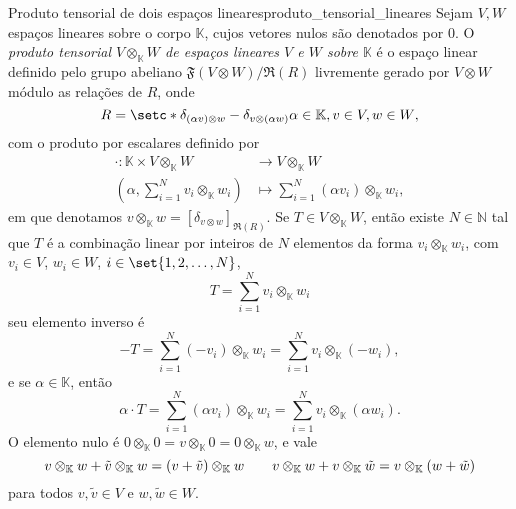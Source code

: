 \begin{proposition}{Produto tensorial de dois espaços lineares}{produto_tensorial_lineares}
    Sejam \(V, W\) espaços lineares sobre o corpo \(\mathbb{K}\), cujos vetores nulos são denotados por \(0\). O \emph{produto tensorial \(V \otimes_{\mathbb{K}} W\) de espaços lineares \(V\) e \(W\) sobre \(\mathbb{K}\)} é o espaço linear definido pelo grupo abeliano \(\mathfrak{F}(V \otimes W)/\mathfrak{R}(R)\) livremente gerado por \(V \otimes W\) módulo as relações de \(R\), onde
    \begin{equation*}
        R = \setc*{\delta_{(\alpha v)\otimes w} - \delta_{v \otimes (\alpha w)}}{\alpha \in \mathbb{K}, v \in V, w \in W},
    \end{equation*}
    com o produto por escalares definido por
    \begin{align*}
        \cdot : \mathbb{K} \times V \otimes_{\mathbb{K}} W &\to V \otimes_{\mathbb{K}} W\\
        \left(\alpha,\sum_{i = 1}^Nv_i \otimes_{\mathbb{K}}w_i\right) &\mapsto \sum_{i = 1}^N (\alpha v_i) \otimes_{\mathbb{K}} w_i,
    \end{align*}
    em que denotamos \(v \otimes_{\mathbb{K}}w = [ \delta_{v \otimes w}]_{\mathfrak{R}(R)}\). Se \(T \in V \otimes_{\mathbb{K}} W\), então existe \(N \in \mathbb{N}\) tal que \(T\) é a combinação linear por inteiros de \(N\) elementos da forma \(v_i \otimes_\mathbb{K} w_i\), com \(v_i \in V\), \(w_i \in W\), \(i \in \set{1, 2,\dots, N}\),
    \begin{equation*}
        T = \sum_{i = 1}^N v_i \otimes_{\mathbb{K}} w_i
    \end{equation*}
    seu elemento inverso é
    \begin{equation*}
        -T = \sum_{i = 1}^N (-v_i) \otimes_{\mathbb{K}} w_i = \sum_{i = 1}^N v_i \otimes_{\mathbb{K}} (-w_i),
    \end{equation*}
    e se \(\alpha \in \mathbb{K}\), então
    \begin{equation*}
        \alpha \cdot T = \sum_{i = 1}^N (\alpha v_i) \otimes_{\mathbb{K}} w_i = \sum_{i = 1}^N v_i \otimes_{\mathbb{K}} (\alpha w_i).
    \end{equation*}
    O elemento nulo é \(0 \otimes_{\mathbb{K}} 0 = v \otimes_{\mathbb{K}} 0 = 0 \otimes_{\mathbb{K}} w\), e vale
    \begin{equation*}
        v \otimes_{\mathbb{K}} w + \tilde{v} \otimes_{\mathbb{K}} w = (v + \tilde{v}) \otimes_{\mathbb{K}} w\quad\text\quad
        v \otimes_{\mathbb{K}} w + v \otimes_{\mathbb{K}} \tilde{w} = v \otimes_{\mathbb{K}} (w + \tilde{w})
    \end{equation*}
    para todos \(v, \tilde{v} \in V\) e \(w, \tilde{w} \in W\).
\end{proposition}
